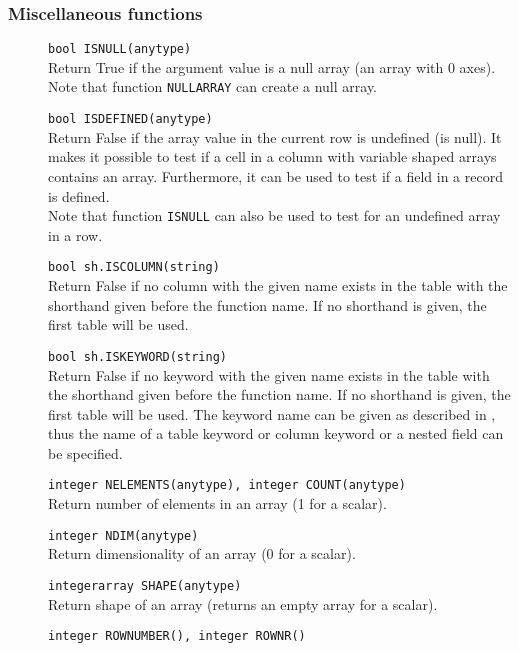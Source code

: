 \subsubsection{Miscellaneous functions}
\begin{description}
  \item[] \texttt{bool ISNULL(anytype)}\\
    Return True if the argument value is a null array (an array with 0
    axes). Note that function {\tt NULLARRAY} can create a null array.
  \item[] \texttt{bool ISDEFINED(anytype)}\\
    Return False if the array value in the current row is undefined (is null).
    It makes it possible to test if a cell in a column with variable shaped arrays
    contains an array. Furthermore, it can be used to test if a field in a
    record is defined.\\
    Note that function {\tt ISNULL} can also be used to test for an undefined
    array in a row.
  \item[] \texttt{bool sh.ISCOLUMN(string)}\\
    Return False if no column with the given name exists in
    the table with the shorthand given before the function name.
    If no shorthand is given, the first table will be used.
  \item[] \texttt{bool sh.ISKEYWORD(string)}\\
    Return False if no keyword with the given name exists in
    the table with the shorthand given before the function name.
    If no shorthand is given, the first table will be used.
    The keyword name can be given as described in
    , thus
    the name of a table keyword or column keyword or a nested field
    can be specified. 
  \item[] \texttt{integer NELEMENTS(anytype), integer COUNT(anytype)}\\
    Return number of elements in an array (1 for a scalar).
  \item[] \texttt{integer NDIM(anytype)}\\
    Return dimensionality of an array (0 for a scalar).
  \item[] \texttt{integerarray SHAPE(anytype)}\\
    Return shape of an array (returns an empty array for a scalar).
  \item[] \texttt{integer ROWNUMBER(), integer ROWNR()}\\

\end{description}
